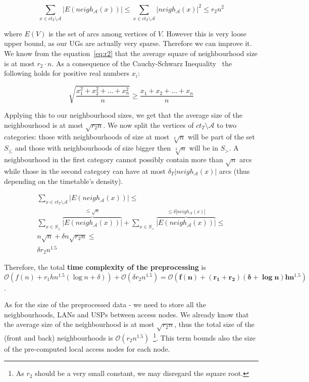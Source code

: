 		$$
		\sum_{x \in ct_{T} \setminus \mathcal{A}} |E(neigh_{\mathcal{A}}(x))| 
		\leq \sum_{x \in ct_{T} \setminus \mathcal{A}} |neigh_{\mathcal{A}}(x)|^{2} 
		\leq r_{2} n^{2}
		$$
		
		\noindent where $E(V)$ is the set of arcs among vertices of $V$. However this is very loose upper bound, as our UGs are actually very sparse. Therefore we can improve it. We know from the equation~\ref{eq:r2} that the average square of neighbourhood size is at most $r_{2} \cdot n$. As a consequence of the Cauchy-Schwarz Inequality~\cite{cauchy} the following holds for positive real numbers $x_{i}$:
		
		$$ 
		\sqrt{\frac{x_{1}^{2} + x_{2}^{2} + ... + x_{n}^{2}}{n}} 
		\geq \frac{x_{1} + x_{2} + ... + x_{n}}{n} $$
		
		\noindent Applying this to our neighbourhood sizes, we get that the average size of the neighbourhood is at most $\sqrt{r_{2}n}$.  We now split the vertices of $ct_{T} \setminus \mathcal{A}$ to two categories: those with neighbourhoods of size at most $\sqrt[4]{n}$ will be part of the set $S_{\leq}$ and those with neighbourhoods of size bigger then $\sqrt[4]{n}$ will be in $S_{>}$. A neighbourhood in the first category cannot possibly contain more than $\sqrt{n}$ arcs while those in the second category can have at most $\delta_{T}|neigh_{\mathcal{A}}(x)|$ arcs (thus depending on the timetable's density).
		
		\begin{align*}
		\sum_{x \in ct_{T} \setminus \mathcal{A}} |E(neigh_{\mathcal{A}}(x))| \leq \\
		\sum_{x \in S_{\leq}} \overbrace{|E(neigh_{\mathcal{A}}(x))|}^{\leq \sqrt{n}} + 
			\sum_{x \in S_{>}} \overbrace{|E(neigh_{\mathcal{A}}(x))|}^{\leq \delta|neigh_{\mathcal{A}}(x)|} \leq \\
		n \sqrt{n} + \delta n \sqrt{r_{2}n} \leq \\
		\delta r_{2} n^{1.5}
		\end{align*}
		
		\noindent Therefore, the total \textbf{time complexity of the preprocessing} is $\mathcal{O}(f(n) + r_{1}hn^{1.5} (\log n + \delta)) + \mathcal{O}(\delta r_{2} n^{1.5}) = \bm{\mathcal{O}(f(n) + (r_{1} + r_{2}) (\delta + \log n) h n^{1.5})}$.
		
		As for the size of the preprocessed data - we need to store all the neighbourhoods, LANs and USPs between access nodes. We already know that the average size of the neighbourhood is at most $\sqrt{r_{2}n}$, thus the total size of the (front and back) neighbourhoods is $\mathcal{O}(r_{2} n^{1.5})$~\footnote{As $r_{2}$ should be a very small constant, we may disregard the square root.}. This term bounds also the size of the pre-computed local access nodes for each node.
		
